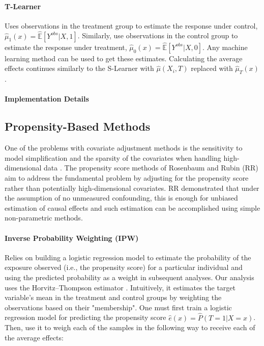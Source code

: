\documentclass[11pt]{article}
\newcommand{\todo}[1]{{\color{orange}{TODO: #1}}}
\newcommand{\gur}[1]{{\color{teal}{Gur: #1}}}
\begin{document}
\paragraph{T-Learner} Uses observations in the treatment group to estimate the response under control, $\hat\mu_1(x) = \hat{\mathbb{E}}[Y^{obs} | X, 1]$. Similarly, use observations in the control group to estimate the response under treatment, $\hat\mu_0(x) = \hat{\mathbb{E}}[Y^{obs} | X, 0]$. Any machine learning method can be used to get these estimates. Calculating the average effects continues similarly to the S-Learner with $\hat \mu (X_i, T)$ replaced with $\hat \mu_T(x)$.

\paragraph{Implementation Details} \todo{}

\gur{Add RMSE comparison between different regression models, argue that we do that because the guarantees only work if the regression model is exact.}

\subsection{Propensity-Based Methods}

One of the problems with covariate adjustment methods is the sensitivity to model simplification and the sparsity of the covariates when handling high-dimensional data \citep{zhao2020propensity}. The propensity score methods of Rosenbaum and Rubin (RR) aim to address the fundamental problem by adjusting for the propensity score rather than potentially high-dimensional covariates. RR demonstrated that under the assumption of no unmeasured confounding, this is enough for unbiased estimation of causal effects and such estimation can be accomplished using simple non-parametric methods. \gur{cite the survey? \citep{abdia2017propensity}}

\paragraph{Inverse Probability Weighting (IPW)} Relies on building a logistic regression model to estimate the probability of the exposure observed (i.e., the propensity score) for a particular individual and using the predicted probability as a weight in subsequent analyses. Our analysis uses the Horvitz–Thompson estimator \citep{horvitz1952generalization}. Intuitively, it estimates the target variable's mean in the treatment and control groups by weighting the observations based on their "membership". One must first train a logistic regression model for predicting the propensity score $\hat e(x) = \hat P(T=1 | X=x)$. Then, use it to weigh each of the samples in the following way to receive each of the average effects:
\end{document}
